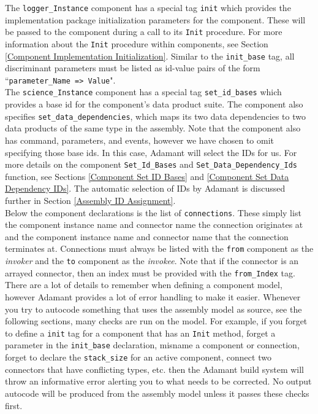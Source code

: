 The \texttt{logger\_Instance} component has a special tag \texttt{init} which provides the implementation package initialization parameters for the component. These will be passed to the component during a call to its \texttt{Init} procedure. For more information about the \texttt{Init} procedure within components, see Section \ref{Component Implementation Initialization}. Similar to the \texttt{init\_base} tag, all discriminant parameters must be listed as id-value pairs of the form ``\texttt{parameter\_Name => Value}". \\

The \texttt{science\_Instance} component has a special tag \texttt{set\_id\_bases} which provides a base id for the component's data product suite. The component also specifies \texttt{set\_data\_dependencies}, which maps its two data dependencies to two data products of the same type in the assembly. Note that the component also has command, parameters, and events, however we have chosen to omit specifying those base ids. In this case, Adamant will select the IDs for us. For more details on the component \texttt{Set\_Id\_Bases} and \texttt{Set\_Data\_Dependency\_Ids} function, see Sections \ref{Component Set ID Bases} and \ref{Component Set Data Dependency IDs}. The automatic selection of IDs by Adamant is discussed further in Section \ref{Assembly ID Assignment}. \\

Below the component declarations is the list of \texttt{connections}. These simply list the component instance name and connector name the connection originates at and the component instance name and connector name that the connection terminates at. Connections must always be listed with the \texttt{from} component as the \textit{invoker} and the \texttt{to} component as the \textit{invokee}. Note that if the connector is an arrayed connector, then an index must be provided with the \texttt{from\_Index} tag. \\

There are a lot of details to remember when defining a component model, however Adamant provides a lot of error handling to make it easier. Whenever you try to autocode something that uses the assembly model as source, see the following sections, many checks are run on the model. For example, if you forget to define a \texttt{init} tag for a component that has an \texttt{Init} method, forget a parameter in the \texttt{init\_base} declaration, misname a component or connection, forget to declare the \texttt{stack\_size} for an active component, connect two connectors that have conflicting types, etc. then the Adamant build system will throw an informative error alerting you to what needs to be corrected. No output autocode will be produced from the assembly model unless it passes these checks first. \\


